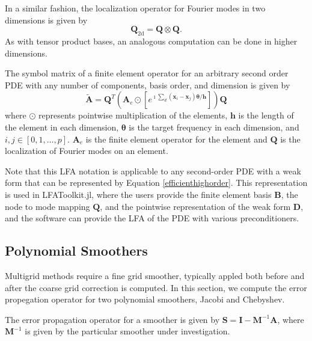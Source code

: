 \documentclass[review]{siamart190516}
\begin{document}
In a similar fashion, the localization operator for Fourier modes in two dimensions is given by
\begin{equation}
\mathbf{Q}_{\text{2d}} = \mathbf{Q} \otimes \mathbf{Q}.
\end{equation}
As with tensor product bases, an analogous computation can be done in higher dimensions.

\begin{definition}
The symbol matrix of a finite element operator for an arbitrary second order PDE with any number of components, basis order, and dimension is given by
\begin{equation}\label{symbolhighorder}
\tilde{\mathbf{A}} = \mathbf{Q}^T \left( \mathbf{A}_e \odot \left[ e^{\imath \sum_d \left( \mathbf{x}_i - \mathbf{x}_j \right) \mathbf{\theta} / \mathbf{h}} \right] \right) \mathbf{Q}
\end{equation}
where $\odot$ represents pointwise multiplication of the elements, $\mathbf{h}$ is the length of the element in each dimension, $\mathbf{\theta}$ is the target frequency in each dimension, and $i, j \in \left[ 0, 1, \dots, p\right]$.
$\mathbf{A}_e$ is the finite element operator for the element and $\mathbf{Q}$ is the localization of Fourier modes on an element.
\end{definition}\label{def:high_order_symbol}

Note that this LFA notation is applicable to any second-order PDE with a weak form that can be represented by Equation \ref{efficienthighorder}.
This representation is used in LFAToolkit.jl, where the users provide the finite element basis $\mathbf{B}$, the node to mode mapping $\mathbf{Q}$, and the pointwise representation of the weak form $\mathbf{D}$, and the software can provide the LFA of the PDE with various preconditioners.

\subsection{Polynomial Smoothers}\label{sec:smooth}

Multigrid methods require a fine grid smoother, typically appled both before and after the coarse grid correction is computed.
In this section, we compute the error propegation operator for two polynomial smoothers, Jacobi and Chebyshev.

The error propagation operator for a smoother is given by $\mathbf{S} = \mathbf{I} - \mathbf{M}^{-1} \mathbf{A}$, where $\mathbf{M}^{-1}$ is given by the particular smoother under investigation.
\end{document}
